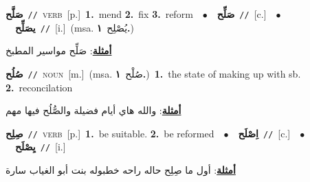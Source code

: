 \documentclass[10pt,a4paper,twoside]{article} %
\begin{document}
\begin{multicols}{2}
{\setlength\topsep{0pt}\textbf{\foreignlanguage{arabic}{صَلَّح}}\ {\color{gray}\texttt{//}\color{black}}\ \textsc{verb}\ [p.]\ \textbf{1.}~mend  \textbf{2.}~fix  \textbf{3.}~reform\ \ $\bullet$\ \ \setlength\topsep{0pt}\textbf{\foreignlanguage{arabic}{صَلِّح}}\ {\color{gray}\texttt{//}\color{black}}\ [c.]\ \ $\bullet$\ \ \setlength\topsep{0pt}\textbf{\foreignlanguage{arabic}{يصَلِّح}}\ {\color{gray}\texttt{//}\color{black}}\ [i.]\ \color{gray}(msa. \foreignlanguage{arabic}{يُصْلِح}~\foreignlanguage{arabic}{\textbf{١.}})\color{black}\  \begin{flushright}\color{gray}\foreignlanguage{arabic}{\textbf{\underline{\foreignlanguage{arabic}{أمثلة}}}: صَلِّح مواسير المطبخ}\end{flushright}\color{black}} \vspace{2mm}

{\setlength\topsep{0pt}\textbf{\foreignlanguage{arabic}{صُلُح}}\ {\color{gray}\texttt{//}\color{black}}\ \textsc{noun}\ [m.]\ \color{gray}(msa. \foreignlanguage{arabic}{صُلْح}~\foreignlanguage{arabic}{\textbf{١.}})\color{black}\ \textbf{1.}~the state of making up with sb.  \textbf{2.}~reconcilation\  \begin{flushright}\color{gray}\foreignlanguage{arabic}{\textbf{\underline{\foreignlanguage{arabic}{أمثلة}}}: والله هاي أيام فضيلة والصُّلُح فيها مهم}\end{flushright}\color{black}} \vspace{2mm}

{\setlength\topsep{0pt}\textbf{\foreignlanguage{arabic}{صِلِح}}\ {\color{gray}\texttt{//}\color{black}}\ \textsc{verb}\ [p.]\ \textbf{1.}~be suitable.  \textbf{2.}~be reformed\ \ $\bullet$\ \ \setlength\topsep{0pt}\textbf{\foreignlanguage{arabic}{اِصْلَح}}\ {\color{gray}\texttt{//}\color{black}}\ [c.]\ \ $\bullet$\ \ \setlength\topsep{0pt}\textbf{\foreignlanguage{arabic}{يِصْلَح}}\ {\color{gray}\texttt{//}\color{black}}\ [i.]\  \begin{flushright}\color{gray}\foreignlanguage{arabic}{\textbf{\underline{\foreignlanguage{arabic}{أمثلة}}}: أول ما صِلِح حاله راحه خطبوله بنت أبو الغياب سارة}\end{flushright}\color{black}} \vspace{2mm}


\end{multicols}
\end{document}

